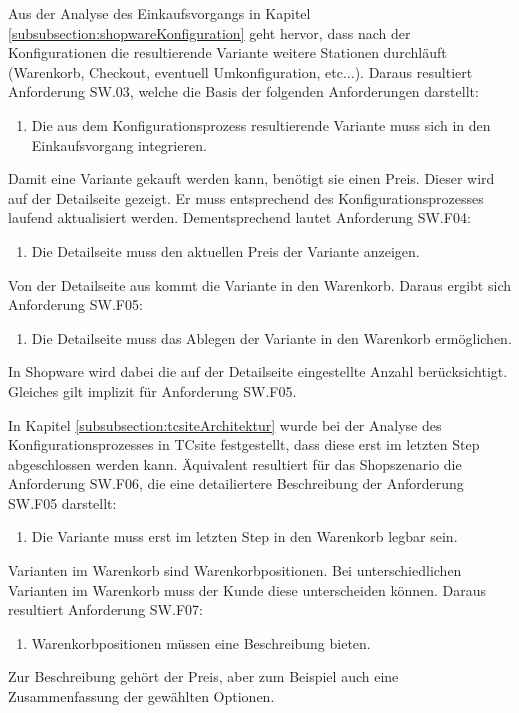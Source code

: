 \documentclass[11pt, a4paper, titlepage, listof=totoc, bibliography=totoc, index=totoc, twoside, openright, headings=normal]{scrreprt}
\begin{document}
Aus der Analyse des Einkaufsvorgangs in Kapitel \ref{subsubsection:shopwareKonfiguration} geht hervor, dass nach der Konfigurationen die resultierende Variante weitere Stationen durchläuft (Warenkorb, Checkout, eventuell Umkonfiguration, etc...). Daraus resultiert Anforderung SW.03, welche die Basis der folgenden Anforderungen darstellt:
\begin{enumerate}[SW.F03:]\bfseries
\item Die aus dem Konfigurationsprozess resultierende Variante muss sich in den Einkaufsvorgang integrieren.
\end{enumerate}
Damit eine Variante gekauft werden kann, benötigt sie einen Preis. Dieser wird auf der Detailseite gezeigt. Er muss entsprechend des Konfigurationsprozesses laufend aktualisiert werden. Dementsprechend lautet Anforderung SW.F04:
\begin{enumerate}[SW.F04:]\bfseries
\item Die Detailseite muss den aktuellen Preis der Variante anzeigen.
\end{enumerate}
Von der Detailseite aus kommt die Variante in den Warenkorb. Daraus ergibt sich Anforderung SW.F05:
\begin{enumerate}[SW.F05:]\bfseries
\item Die Detailseite muss das Ablegen der Variante in den Warenkorb ermöglichen.
\end{enumerate}
In Shopware wird dabei die auf der Detailseite eingestellte Anzahl berücksichtigt. Gleiches gilt implizit für Anforderung SW.F05.

In Kapitel \ref{subsubsection:tcsiteArchitektur} wurde bei der Analyse des Konfigurationsprozesses in TCsite festgestellt, dass diese erst im letzten Step abgeschlossen werden kann. Äquivalent resultiert für das Shopszenario die Anforderung SW.F06, die eine detailiertere Beschreibung der Anforderung SW.F05 darstellt:
\begin{enumerate}[SW.F06:]\bfseries
\item Die Variante muss erst im letzten Step in den Warenkorb legbar sein.
\end{enumerate}
Varianten im Warenkorb sind Warenkorbpositionen. Bei unterschiedlichen Varianten im Warenkorb muss der Kunde diese unterscheiden können. Daraus resultiert Anforderung SW.F07:
\begin{enumerate}[SW.F07:]\bfseries
\item Warenkorbpositionen müssen eine Beschreibung bieten.
\end{enumerate}
Zur Beschreibung gehört der Preis, aber zum Beispiel auch eine Zusammenfassung der gewählten Optionen.
\end{document}
